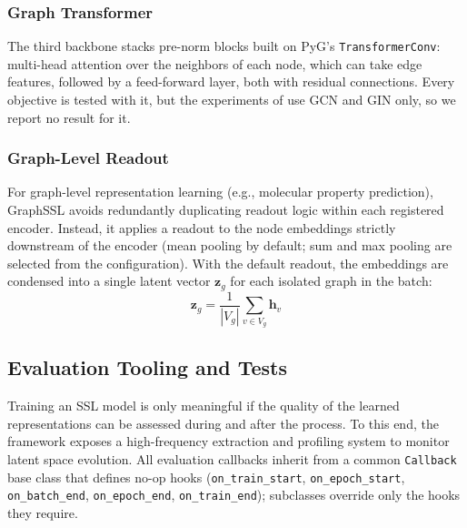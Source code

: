 \documentclass[conference]{IEEEtran}
\begin{document}
\subsubsection{Graph Transformer}
The third backbone stacks pre-norm blocks built on PyG's \texttt{TransformerConv}: multi-head attention over the neighbors of each node, which can take edge features, followed by a feed-forward layer, both with residual connections. Every objective is tested with it, but the experiments of  use GCN and GIN only, so we report no result for it.

\subsubsection{Graph-Level Readout}
For graph-level representation learning (e.g., molecular property prediction), GraphSSL avoids redundantly duplicating readout logic within each registered encoder. Instead, it applies a readout to the node embeddings strictly downstream of the encoder (mean pooling by default; sum and max pooling are selected from the configuration). With the default readout, the embeddings are condensed into a single latent vector $\bm{z}_g$ for each isolated graph in the batch:
\begin{equation}
\bm{z}_g = \frac{1}{|V_g|} \sum_{v \in V_g} \bm{h}_v
\end{equation}

\subsection{Evaluation Tooling and Tests}
\label{sec:callbacks}
Training an SSL model is only meaningful if the quality of the learned representations can be assessed during and after the process. To this end, the framework exposes a high-frequency extraction and profiling system to monitor latent space evolution. All evaluation callbacks inherit from a common \texttt{Callback} base class that defines no-op hooks (\texttt{on\_train\_start}, \texttt{on\_epoch\_start}, \texttt{on\_batch\_end}, \texttt{on\_epoch\_end}, \texttt{on\_train\_end}); subclasses override only the hooks they require.
\end{document}
